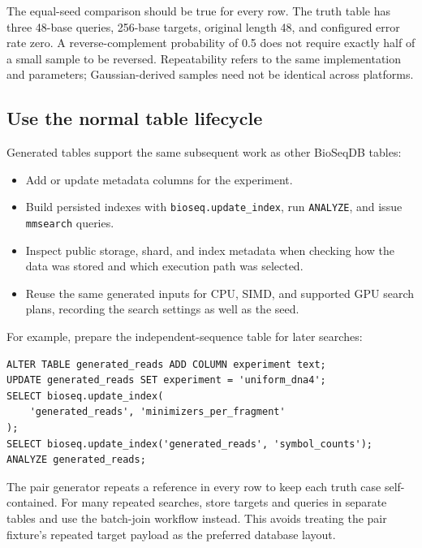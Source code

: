 The equal-seed comparison should be true for every row. The truth table has
three 48-base queries, 256-base targets, original length 48, and configured
error rate zero. A reverse-complement probability of 0.5 does not require
exactly half of a small sample to be reversed. Repeatability refers to the
same implementation and parameters; Gaussian-derived samples need not be
identical across platforms.

\subsection{Use the normal table lifecycle}

Generated tables support the same subsequent work as other BioSeqDB tables:
\begin{itemize}
  \item Add or update metadata columns for the experiment.
  \item Build persisted indexes with \texttt{bioseq.update\_index}, run
        \texttt{ANALYZE}, and issue \texttt{mmsearch} queries.
  \item Inspect public storage, shard, and index metadata when checking how
        the data was stored and which execution path was selected.
  \item Reuse the same generated inputs for CPU, SIMD, and supported GPU
        search plans, recording the search settings as well as the seed.
\end{itemize}

For example, prepare the independent-sequence table for later searches:
\par\noindent\begin{minipage}{\linewidth}
\begin{lstlisting}[style=bioseq-appendix-sql]
ALTER TABLE generated_reads ADD COLUMN experiment text;
UPDATE generated_reads SET experiment = 'uniform_dna4';
SELECT bioseq.update_index(
    'generated_reads', 'minimizers_per_fragment'
);
SELECT bioseq.update_index('generated_reads', 'symbol_counts');
ANALYZE generated_reads;
\end{lstlisting}
\end{minipage}

The pair generator repeats a reference in every row to keep each truth case
self-contained. For many repeated searches, store targets and queries in
separate tables and use the batch-join workflow instead. This avoids treating
the pair fixture's repeated target payload as the preferred database layout.

